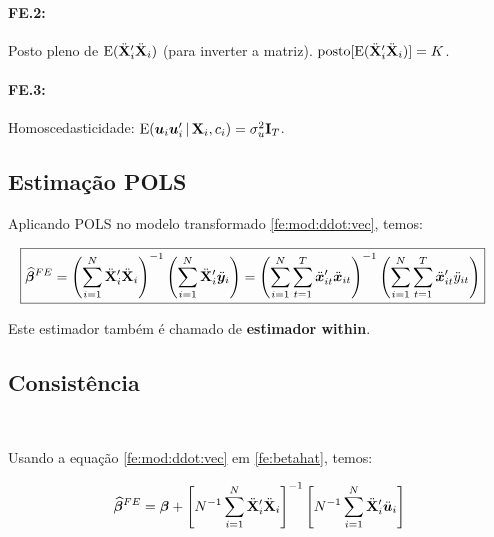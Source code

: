 \documentclass[11pt, oneside, a4paper, article]{article}
\numberwithin{equation}{section}
\begin{document}
\paragraph{FE.2:} Posto pleno de $\text{E}( \ddot{\mathbf{X}}_{i}' \ddot{\mathbf{X}}_{i} )$ (para inverter a matriz).
$\text{posto}[ \text{E}( \ddot{\mathbf{X}}_{i}'  \ddot{\mathbf{X}}_{i} ) ]  = K$.

\paragraph{FE.3:} Homoscedasticidade:
$\text{E}( \boldsymbol{u}_{i} \boldsymbol{u}_{i}' \,|\, \mathbf{X}_{i}, c_{i}) = \sigma_{u}^{2} \mathbf{I}_{T}$.

\subsection{Estimação POLS}
\noindent
\citet[p.269]{wool-2010} 

\noindent
Aplicando POLS no modelo transformado \eqref{fe:mod:ddot:vec}, temos:

\vspace{-1 em}
\begin{align} \label{fe:betahat}
	\Aboxed{
		\betavechat^{FE} =
		\left( \sum_{i=1}^{N} \ddot{\Xmat}_{i}' \ddot{\Xmat}_{i} \right)^{-1}
		\left( \sum_{i=1}^{N} \ddot{\Xmat}_{i}' \ddot{\yvec}_{i} \right)
		=
		\left( \sum_{i=1}^{N} \sum_{t=1}^{T} \ddot{\xvec}_{it}' \ddot{\xvec}_{it} \right)^{-1}
		\left( \sum_{i=1}^{N} \sum_{t=1}^{T} \ddot{\xvec}_{it}' \ddot{y}_{it} \right)
	}
\end{align}

\noindent
Este estimador também é chamado de \textbf{estimador within}.

\subsection{Consistência}
\noindent
\citet[sec.10.5.1 -- Consistency of the Fixed Effects Estimator, p.265--269]{wool-2010} \\
\citet[p.269]{wool-2010} 

\vspace{1 em}
\noindent
Usando a equação \eqref{fe:mod:ddot:vec} em \eqref{fe:betahat}, temos:

\vspace{-1 em}
\begin{align} \label{fe:betahat:2}
	\widehat{\boldsymbol{\beta}}^{FE} =
	\boldsymbol{\beta} +
	\left[ N^{-1} \sum_{i=1}^{N} \ddot{\mathbf{X}}_{i}' \ddot{\mathbf{X}}_{i} \right]^{-1}
	\left[ N^{-1} \sum_{i=1}^{N} \ddot{\mathbf{X}}_{i}' \ddot{\boldsymbol{u}}_{i} \right]
\end{align}
\end{document}
